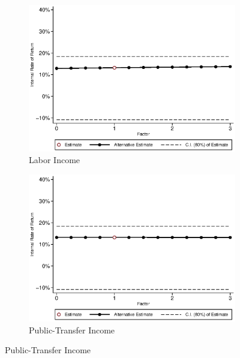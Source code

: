 \begin{figure}[H]
\caption{Internal Rate of Return vs.~Components, Males} \label{fig:irrf_factor_m}
	\begin{subfigure}[h]{0.8\textwidth}
	\centering
	\caption{Labor Income} \label{fig:irrf_inc_labor_m1}
	\includegraphics[width=\textwidth]{AppOutput/Sensitivity/irrf_inc_labor_m1.eps}
	\end{subfigure}	
	
	\begin{subfigure}[h]{0.8\textwidth}
	\centering
	\caption{Public-Transfer Income} \label{fig:irrf_transfer_m1}
	\includegraphics[width=\textwidth]{AppOutput/Sensitivity/irrf_transfer_m1.eps}
	\end{subfigure}
\end{figure}
	
